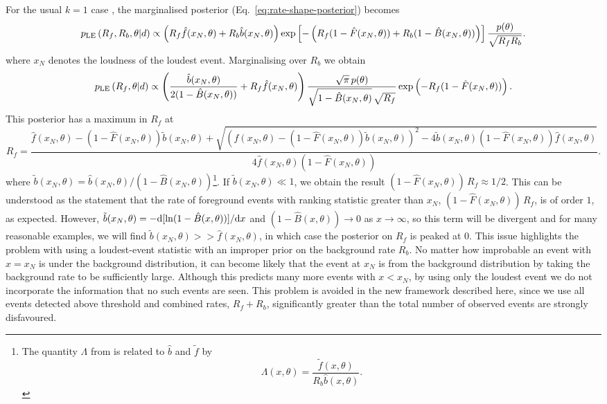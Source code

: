 \documentclass[aps,prd]{revtex4-1}
\begin{document}
For the usual $k=1$ case \citep{Biswas2009}, the marginalised
posterior (Eq.~\eqref{eq:rate-shape-posterior}) becomes
\begin{equation}
p_{\rm LE}\left( R_f, R_b, \theta | d \right) \propto \left(R_f
\hat{f}(x_N,\theta) + R_b \hat{b}(x_N,\theta)\right)\exp\left[-\left(
  R_f (1-\hat{F}(x_N,\theta)) + R_b (1-\hat{B}(x_N,\theta)) \right)
  \right] \frac{p(\theta)}{\sqrt{R_f R_b}}.
\end{equation}
where $x_N$ denotes the loudness of the loudest event. Marginalising
over $R_b$ we obtain
\begin{equation}
p_{\rm LE}\left( R_f, \theta | d \right) \propto \left(
\frac{\hat{b}(x_N,\theta)}{2(1-\hat{B}(x_N,\theta))} + R_f
\hat{f}(x_N,\theta)\right)\frac{\sqrt{\pi}\,
  p(\theta)}{\sqrt{1-\hat{B}(x_N,\theta)}\,\sqrt{R_f}}
\exp\left(-R_f(1-\hat{F}(x_N,\theta))\right) .
\end{equation}
This posterior has a maximum in $R_f$ at
\begin{equation}
R_f =
\frac{\hat{f}(x_N,\theta)-(1-\hat{F}(x_N,\theta))\tilde{b}(x_N,\theta)
  +
  \sqrt{\left(\hat{f}(x_N,\theta)-(1-\hat{F}(x_N,\theta))\tilde{b}(x_N,\theta)\right)^2
    -
    4\tilde{b}(x_N,\theta)(1-\hat{F}(x_N,\theta))\hat{f}(x_N,\theta)}}{4
  \hat{f}(x_N,\theta)(1-\hat{F}(x_N,\theta))}.
\end{equation}
where $\tilde{b}(x_N,\theta) = \hat{b}(x_N,\theta) /
(1-\hat{B}(x_N,\theta))$\footnote{The quantity $\Lambda$ from
  \citet{Biswas2009} is related to $\hat{b}$ and $\tilde{f}$ by
  \begin{equation}
    \Lambda(x, \theta) = \frac{\tilde{f}(x,\theta)}{R_b \hat{b}(x,\theta)}.
\end{equation}}.  If $\tilde{b}(x_N,\theta) \ll 1$, we obtain the result $(1-
\hat{F}(x_N,\theta))\,R_f \approx 1/2$. This can be understood as the
statement that the rate of foreground events with ranking statistic
greater than $x_N$, $(1- \hat{F}(x_N,\theta))\,R_f$, is of order $1$,
as expected. However, $\tilde{b}(x_N,\theta) = -{\rm d}
[\ln(1-\hat{B}(x,\theta))]/{\rm d}x$ and $(1-\hat{B}(x,\theta))
\rightarrow 0$ as $x \rightarrow \infty$, so this term will be
divergent and for many reasonable examples, we will find
$\tilde{b}(x_N,\theta) >> \hat{f}(x_N,\theta)$, in which case the
posterior on $R_f$ is peaked at $0$. This issue highlights the problem
with using a loudest-event statistic with an improper prior on the
background rate $R_b$. No matter how improbable an event with $x=x_N$
is under the background distribution, it can become likely that the
event at $x_N$ is from the background distribution by taking the
background rate to be sufficiently large. Although this predicts many
more events with $x < x_N$, by using only the loudest event we do not
incorporate the information that no such events are seen. This problem
is avoided in the new framework described here, since we use all
events detected above threshold and combined rates, $R_f+R_b$,
significantly greater than the total number of observed events are
strongly disfavoured.
\end{document}
